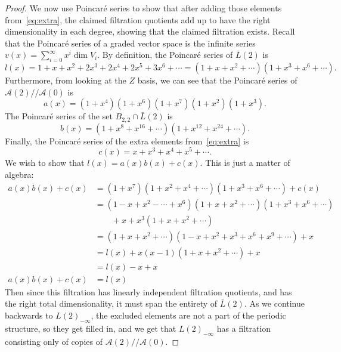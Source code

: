 \documentclass{article}
\newcommand{\A}{\mathcal{A}}
\newcommand{\mmod}{/\!/\!}
\renewcommand{\L}{\bar{L}}
\newcommand{\Lkm}[1][k]{L{(#1)}_{-\infty}}
\begin{document}
\begin{proof}
  We now use Poincar\'e series to show that after adding those elements from~\eqref{eq:extra}, the claimed filtration quotients add up to have the right dimensionality in each degree, showing that the claimed filtration exists.  Recall that the Poincar\'e series of a graded vector space is the infinite series $v(x) = \sum_{i=0}^{\infty} x^i \dim V_i$.  By definition, the Poincar\'e series of $\L(2)$ is
  \[ l(x) = 1 + x + x^2 + 2x^3 + 2x^4 + 2x^5 + 3x^6 + \cdots = (1 + x + x^2 + \cdots)(1 + x^3 + x^6 + \cdots).\]
  Furthermore, from looking at the $Z$ basis, we can see that the Poincar\'e series of $\A(2)\mmod\A(0)$ is
  \[ a(x) = (1+x^4)(1+x^6)(1+x^7)(1+x^2)(1+x^3).\]
  The Poincar\'e series of the set $B_{2,2}\cap \L(2)$ is
  \[ b(x) = (1 + x^8 + x^{16} + \cdots)(1 + x^{12} + x^{24} + \cdots).\]
  Finally, the Poincar\'e series of the extra elements from~\eqref{eq:extra} is
  \[ c(x) = x + x^3 + x^4 + x^5 + \cdots.\]
  We wish to show that $l(x) = a(x)b(x) + c(x)$.  This is just a matter of algebra:
  \begin{align*}
    a(x)b(x) + c(x) &= (1+x^7)(1 + x^2 + x^4 + \cdots)(1 + x^3 + x^6 + \cdots) + c(x) \\
                    &= (1-x+x^2-\cdots+x^6)(1 + x + x^2 + \cdots)(1 + x^3 + x^6 + \cdots) \\
                    &\qquad + x + x^3(1 + x + x^2 + \cdots) \\
                    &= (1 + x + x^2 + \cdots)(1 - x + x^2 + x^3 + x^6 + x^9 + \cdots) + x \\
                    &= l(x) + x(x-1)(1 + x + x^2 + \cdots) + x \\
                    &= l(x) - x + x \\
    a(x)b(x) + c(x) &= l(x)
  \end{align*}
  Then since this filtration has linearly independent filtration quotients, and has the right total dimensionality, it must span the entirety of $\L(2)$.  As we continue backwards to $\Lkm[2]$, the excluded elements are not a part of the periodic structure, so they get filled in, and we get that $\Lkm[2]$ has a filtration consisting only of copies of $\A(2)\mmod\A(0)$.
\end{proof}


\end{document}
